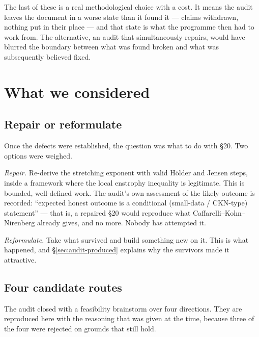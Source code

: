 The last of these is a real methodological choice with a cost. It means the
audit leaves the document in a worse state than it found it --- claims
withdrawn, nothing put in their place --- and that state is what the programme
then had to work from. The alternative, an audit that simultaneously repairs,
would have blurred the boundary between what was found broken and what was
subsequently believed fixed.

\section{What we considered}
\label{sec:audit-considered}

\subsection{Repair or reformulate}

Once the defects were established, the question was what to do with \S20. Two
options were weighed.

\emph{Repair.} Re-derive the stretching exponent with valid H\"older and
Jensen steps, inside a framework where the local enstrophy inequality is
legitimate. This is bounded, well-defined work. The audit's own assessment of
the likely outcome is recorded: ``expected honest outcome is a conditional
(small-data / CKN-type) statement'' --- that is, a repaired \S20 would
reproduce what Caffarelli--Kohn--Nirenberg already gives, and no more. Nobody
has attempted it.

\emph{Reformulate.} Take what survived and build something new on it. This is
what happened, and \S\ref{sec:audit-produced} explains why the survivors made
it attractive.

\subsection{Four candidate routes}

The audit closed with a feasibility brainstorm over four directions. They are
reproduced here with the reasoning that was given at the time, because three
of the four were rejected on grounds that still hold.


